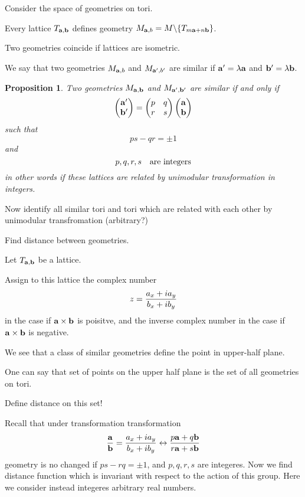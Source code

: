 \documentclass[12pt]{article}
\newtheorem{proposition}{Proposition}
\theoremstyle{definition}
\numberwithin{equation}{section}
\begin{document}
  Consider the space of geometries on tori.

Every lattice $T_{{\bf a},{\bf b}}$ defines
geometry $M_{{\bf a},b}=M\backslash {\{T_{m{\bf a}+n{\bf b}}\}}$.

Two geometries coincide if lattices are isometric.

 We say that two geometries  $M_{{\bf a},b}$
and $M_{{\bf a}',b'}$ are similar if 
${\bf a}'=\lambda{\bf a}$ and ${\bf b}'=\lambda {\bf b}$.

\begin{proposition}
Two geometries $M_{{\bf a},{\bf b}}$ and $M_{{\bf a}',{\bf b}'}$
are similar if and only if
            $$
  \begin{pmatrix}
      {\bf a}'\cr
       {\bf b}'\cr
  \end{pmatrix}=  
     \begin{pmatrix}
      p & q\cr
        r & s\cr
  \end{pmatrix}
     \begin{pmatrix}
      {\bf a}\cr
       {\bf b}\cr
  \end{pmatrix}
            $$
such that
      $$
    ps-qr=\pm 1
      $$
and
       $$
p,q,r,s \quad \hbox {are integers}
       $$
in other words if these lattices are related by
unimodular transformation in integers.


\end{proposition}


Now identify all similar tori and tori which are related
with each other by unimodular transfromation
  (arbitrary?)

Find distance between geometries.

Let $T_{{\bf a},{\bf b}}$ be a lattice.

Assign to this lattice the  complex number
         $$
z={a_x+ia_y\over b_x+ib_y}
         $$
in the case if ${\bf a}\times {\bf b}$ is poisitve, and
the inverse complex number in the case if
  ${\bf a}\times {\bf b}$ is negative.

We see that a class of similar geometries
define the point in upper-half plane.
 
One can say that set of points on the upper half plane
is the set of all geometries on tori.

Define distance on this set!

Recall that under transformation
transformation
     $$
{{\bf a}\over {\bf b}}={a_x+ia_y\over b_x+ib_y}\leftrightarrow
  {p{\bf a}+q{\bf b}\over r{\bf a}+s{\bf b}}
       $$
geometry is no changed if $ps-rq=\pm 1$, and $p,q,r,s$
are integeres.  Now we find distance function which is
invariant with respect to the action of this group.
Here we consider instead integeres arbitrary real numbers.
\end{document}

